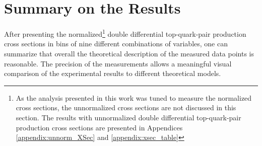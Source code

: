 %  
% 
% 
% 

\section{Summary on the Results}

After presenting the normalized\footnote{As the analysis presented in this work was tuned to measure the normalized cross sections, the unnormalized cross sections are not
discussed in this section. The results with unnormalized double differential top-quark-pair production cross sections are presented in Appendices \ref{appendix:unnorm_XSec}
and \ref{appendix:xsec_table}} double differential top-quark-pair production cross sections in bins of nine different combinations of variables,
one can summarize that overall the theoretical description of the measured data points is reasonable. The precision of the measurements allows a meaningful visual 
comparison of the experimental results to different theoretical models.

